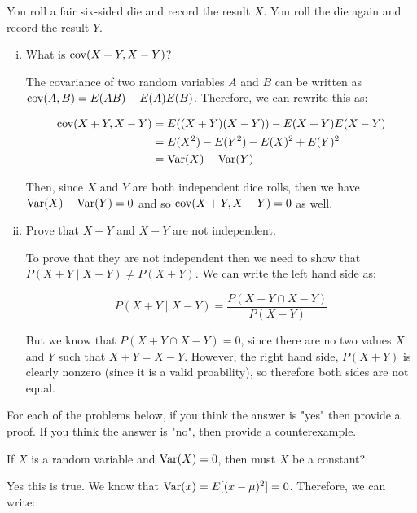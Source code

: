 \documentclass[11pt]{article}
\begin{document}
\begin{Parts}
	\Part You roll a fair six-sided die and record the result $X$. You roll the die again and record the result $Y$. 
	
	\begin{enumerate}[(i)]
		\item What is $\operatorname{cov} (X+Y, X-Y)$? 
		
        \begin{solution}
            The covariance of two random variables $A$ and $B$ can be written as $\operatorname{cov}(A, B) = E(AB) - E(A) E(B)$. Therefore, we can rewrite this as: 

            \begin{align*}
                \operatorname{cov}(X + Y, X - Y) &= E((X+Y)(X - Y)) - E(X + Y)E(X - Y)\\
                &= E(X^2) -  E(Y^2) - E(X)^2 + E(Y)^2\\
                &= \operatorname{Var}(X) - \operatorname{Var}(Y)
            \end{align*}

            Then, since $X$ and $Y$ are both independent dice rolls, then we have $\operatorname{Var}(X) - \operatorname{Var}(Y) = 0$ and so $\operatorname{cov}(X + Y, X - Y) = 0$ as well. 
        \end{solution}
		\item Prove that $X+Y$ and $X-Y$ are not independent.
		
        \begin{solution}
            To prove that they are not independent then we need to show that $P(X +Y \mid X - Y) \neq P(X + Y)$. We can write the left hand side as: 

            \[ P(X + Y \mid X - Y) = \frac{P(X + Y \cap X - Y)}{P(X - Y)}\] 

            But we know that $P(X + Y \cap X - Y) = 0$, since there are no two values $X$ and $Y$ such that $X + Y = X - Y$. However, the right hand side, $P(X + Y)$ is clearly nonzero (since it is a valid proability), so therefore both sides are not equal.
        \end{solution}
	\end{enumerate}

	
	For each of the problems below, if you think the answer is "yes" then provide a proof. If you think the answer is "no", then provide a counterexample.
	
	\Part If $X$ is a random variable and $\operatorname{Var} (X) = 0$, then must $X$ be a constant?

    \begin{solution}
        Yes this is true. We know that $\operatorname{Var}(x) = E[(x - \mu)^2] = 0$. Therefore, we can write: 


\end{solution}
\end{Parts}
\end{document}
